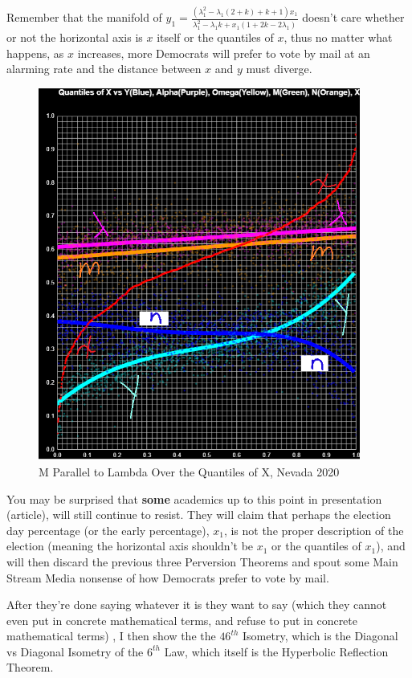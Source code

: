 Remember that the manifold of $y_{1}=\frac{(\lambda_{1}^2-\lambda_{1}(2+k)+k+1)x_{1}}{\lambda_{1}^2-\lambda_{1}k+x_{1}(1+2k-2\lambda_{1})}$ doesn't care whether or not the horizontal axis is $x$ itself or the quantiles of $x$, thus no matter what happens, as $x$ increases, more Democrats will prefer to vote by mail at an alarming rate and the distance between $x$ and $y$ must diverge.
\begin{figure}[bp!]
\begin{center}
\caption{M Parallel to Lambda Over the Quantiles of X, Nevada 2020}
\includegraphics[width=300pt]{M Lambda Parallel.png}
\end{center}
\end{figure}
\newpage
You may be surprised that \textbf{some} academics up to this point in presentation (article), will still continue to resist. They will claim that perhaps the election day percentage (or the early percentage), $x_{1}$, is not the proper description of the election (meaning the horizontal axis shouldn't be $x_{1}$ or the quantiles of $x_{1}$), and will then discard the previous three Perversion Theorems and spout some Main Stream Media nonsense of how Democrats prefer to vote by mail.

After they're done saying whatever it is they want to say (which they cannot even put in concrete mathematical terms, and refuse to put in concrete mathematical terms) , I then show the the $46^{th}$ Isometry, which is the Diagonal vs Diagonal Isometry of the $6^{th}$ Law, which itself is the Hyperbolic Reflection Theorem.

